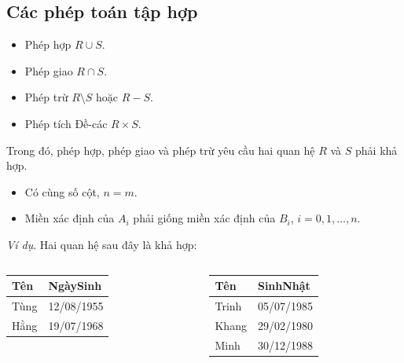 \documentclass[11pt, handout]{beamer}
\begin{document}
  \subsection{Các phép toán tập hợp}
  \begin{frame}
    \begin{itemize}
      \item<2-> Phép hợp $R \cup S$.
      \item<2-> Phép giao $R \cap S$.
      \item<2-> Phép trừ $R \setminus S$ hoặc $R - S$.
      \item<2-> Phép tích Đề-các $R \times S$.
    \end{itemize}
  \end{frame}
  \begin{frame}
    Trong đó, phép hợp, phép giao và phép trừ yêu cầu hai quan hệ $R$ và $S$ phải khả hợp.
  \end{frame}
  \begin{frame}
    \begin{itemize}
      \item<2-> Có cùng số cột, $n = m$.
      \item<3-> Miền xác định của $A_i$ phải giống miền xác định của $B_i$, $i = 0, 1, \dots, n$.
    \end{itemize}
  \end{frame}
  \begin{frame}
    \textit{Ví dụ}. Hai quan hệ sau đây là khả hợp:
    \begin{center}
      \begin{columns}[T]
        \begin{column}{0.5\textwidth}
          \begin{tabular}{|l|l|}
            \hline
            Tên & NgàySinh \\ \hline
            Tùng & 12/08/1955 \\ \hline
            Hằng & 19/07/1968 \\ \hline        
          \end{tabular}
        \end{column}
        \begin{column}{0.5\textwidth}
          \begin{tabular}{|l|l|}
            \hline
            Tên & SinhNhật \\ \hline
            Trinh & 05/07/1985 \\ \hline
            Khang & 29/02/1980 \\ \hline 
            Minh & 30/12/1988 \\ \hline
          \end{tabular}
        \end{column}
      \end{columns}
    \end{center}
  \end{frame}
\end{document}
